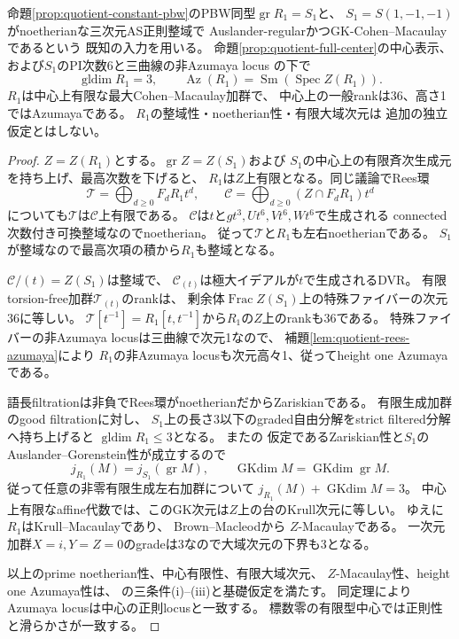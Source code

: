 \begin{proposition}
\label{prop:quotient-azumaya}
命題\ref{prop:quotient-constant-pbw}のPBW同型$\operatorname{gr}R_1=S_1$と、
$S_1=S(1,-1,-1)$がnoetherianな三次元AS正則整域で
Auslander-regularかつGK-Cohen--Macaulayであるという
既知の入力を用いる。
命題\ref{prop:quotient-full-center}の中心表示、
および$S_1$のPI次数6と三曲線の非Azumaya locus
\cite[Theorem~1.3, Lemma~5.4, \S8.2]{WWYSklyanin}の下で
\[
 \operatorname{gldim}R_1=3,\qquad
 \operatorname{Az}(R_1)
 =\operatorname{Sm}(\operatorname{Spec}Z(R_1)).
\]
$R_1$は中心上有限な最大Cohen--Macaulay加群で、
中心上の一般rankは36、高さ1ではAzumayaである。
$R_1$の整域性・noetherian性・有限大域次元は
追加の独立仮定とはしない。
\end{proposition}
\begin{proof}
$Z=Z(R_1)$とする。$\operatorname{gr}Z=Z(S_1)$および
$S_1$の中心上の有限斉次生成元を持ち上げ、最高次数を下げると、
$R_1$は$Z$上有限となる。同じ議論でRees環
\[
 \mathcal T=\bigoplus_{d\ge0}F_dR_1t^d,\qquad
 \mathcal C=\bigoplus_{d\ge0}(Z\cap F_dR_1)t^d
\]
についても$\mathcal T$は$\mathcal C$上有限である。
$\mathcal C$は$t$と$gt^3,Ut^6,Vt^6,Wt^6$で生成される
connected次数付き可換整域なのでnoetherian。
従って$\mathcal T$と$R_1$も左右noetherianである。
$S_1$が整域なので最高次項の積から$R_1$も整域となる。

$\mathcal C/(t)=Z(S_1)$は整域で、
$\mathcal C_{(t)}$は極大イデアルが$t$で生成されるDVR。
有限torsion-free加群$\mathcal T_{(t)}$のrankは、
剰余体$\operatorname{Frac}Z(S_1)$上の特殊ファイバーの次元36に等しい。
$\mathcal T[t^{-1}]=R_1[t,t^{-1}]$から$R_1$の$Z$上のrankも36である。
特殊ファイバーの非Azumaya locusは三曲線で次元1なので、
補題\ref{lem:quotient-rees-azumaya}により
$R_1$の非Azumaya locusも次元高々1、従ってheight one Azumayaである。

語長filtrationは非負でRees環がnoetherianだからZariskianである。
有限生成加群のgood filtrationに対し、
$S_1$上の長さ3以下のgraded自由分解をstrict filtered分解へ持ち上げると
$\operatorname{gldim}R_1\le3$となる。
また\cite[Proposition~3.2(ii)]{LevasseurNoncomm}の
仮定であるZariskian性と$S_1$のAuslander--Gorenstein性が成立するので
\[
 j_{R_1}(M)=j_{S_1}(\operatorname{gr}M),\qquad
 \operatorname{GKdim}M=\operatorname{GKdim}\operatorname{gr}M.
\]
従って任意の非零有限生成左右加群について
$j_{R_1}(M)+\operatorname{GKdim}M=3$。
中心上有限なaffine代数では、このGK次元は$Z$上の台のKrull次元に等しい。
ゆえに$R_1$はKrull--Macaulayであり、
Brown--Macleod\cite[Theorem~4.8, (i)$\Rightarrow$(iii)]{BrownMacleod}から
$Z$-Macaulayである。
一次元加群$X=i,Y=Z=0$のgradeは3なので大域次元の下界も3となる。

以上のprime noetherian性、中心有限性、有限大域次元、
$Z$-Macaulay性、height one Azumaya性は、
\cite[Theorem~3.13]{BrownMacleod}の三条件(i)--(iii)と基礎仮定を満たす。
同定理によりAzumaya locusは中心の正則locusと一致する。
標数零の有限型中心では正則性と滑らかさが一致する。
\end{proof}

